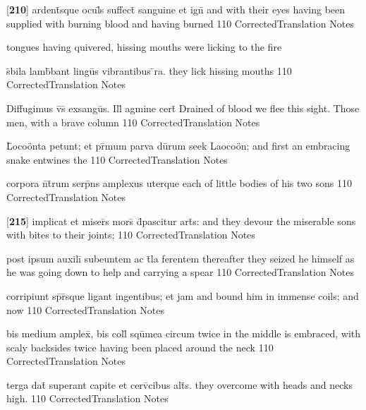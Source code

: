 \latline
  {[\textbf{210}] ardent\={\macron {\i}}sque ocul\={}s suffect\={\macron {\i}} sanguine et ign\={\macron {\i}}}
  { and with their eyes having been supplied with burning blood and having burned  }
  {110}
  { CorrectedTranslation }
  { Notes }
 
tongues having quivered, hissing mouths were licking to the fire

\latline
  {s\={\macron {\i}}bila lamb\={}bant lingu\={\macron {\i}}s vibrantibus \={}ra.}
  { they lick hissing mouths  }
  {110}
  { CorrectedTranslation }
  { Notes }


\latline
  {Diffugimus v\={\macron {\i}}s\={} exsangu\={}s.  Ill\={\macron {\i}} agmine cert\={}}
  { Drained of blood we flee this sight.  Those men, with a brave column }
  {110}
  { CorrectedTranslation }
  { Notes }


\latline
  {L\={}oco\"{o}nta petunt; et pr\={\macron {\i}}mum parva du\={}rum}
  { seek Laoco\"on; and first an embracing snake entwines the  }
  {110}
  { CorrectedTranslation }
  { Notes }


\latline
  {corpora n\={}t\={}rum serp\={}ns amplexus uterque}
  { each of little bodies of his two sons }
  {110}
  { CorrectedTranslation }
  { Notes }


\latline
  {[\textbf{215}] implicat et miser\={}s mors\={} d\={}pascitur art\={}s:}
  { and they devour the miserable sons with bites to their joints; }
  {110}
  { CorrectedTranslation }
  { Notes }


\latline
  {post ipsum auxili\={} subeuntem ac t\={}la ferentem}
  { thereafter they seized he himself as he was going down to help and carrying a spear }
  {110}
  { CorrectedTranslation }
  { Notes }


\latline
  {corripiunt sp\={\macron {\i}}r\={\macron {\i}}sque ligant ingentibus; et jam}
  { and bound him in immense coils; and now  }
  {110}
  { CorrectedTranslation }
  { Notes }


\latline
  {bis medium amplex\={\macron {\i}}, bis coll\={} squ\={}mea circum}
  { twice in the middle is embraced, with scaly backsides twice having been placed around the neck   }
  {110}
  { CorrectedTranslation }
  { Notes }


\latline
  {terga dat\={\macron {\i}} superant capite et cerv\={\macron {\i}}cibus alt\={\macron {\i}}s.}
  { they overcome with heads and necks high. }
  {110}
  { CorrectedTranslation }
  { Notes }



